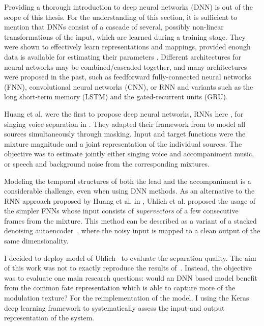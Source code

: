 Providing a thorough introduction to deep neural networks (DNN) is out of the scope of this thesis.
For the understanding of this section, it is sufficient to mention that DNNs consist of a cascade of several, possibly non-linear transformations of the input, which are learned during a training stage.
They were shown to effectively learn representations and mappings, provided enough data is available for estimating their parameters \cite{deng14, lecun15, goodfellow16}.
Different architectures for neural networks may be combined/cascaded together, and many architectures were proposed in the past, such as feedforward fully-connected neural networks (FNN), convolutional neural networks (CNN), or RNN and variants such as the long short-term memory (LSTM) and the gated-recurrent units (GRU).
\par
Huang et al. were the first to propose deep neural networks, RNNs here \cite{hermans13,pascanu14}, for singing voice separation in \cite{huang14,huang15}. They adapted their framework from \cite{huang142} to model all sources simultaneously through masking. Input and target functions were the mixture magnitude and a joint representation of the individual sources. The objective was to estimate jointly either singing voice and accompaniment music, or speech and background noise from the corresponding mixtures.
\par
Modeling the temporal structures of both the lead and the accompaniment is a considerable challenge, even when using DNN methods. As an alternative to the RNN approach proposed by Huang et al. in \cite{huang14}, Uhlich et al. proposed the usage of the simpler FNNs \cite{uhlich15} whose input consists of \textit{supervectors} of a few consecutive frames from the mixture.
This method can be described as a variant of a stacked denoising autoencoder~\cite{pvincent08}, where the noisy input is mapped to a clean output of the same dimensionality.
\par
I decided to deploy model of Uhlich~\cite{uhlich15} to evaluate the separation quality.
The aim of this work was not to exactly reproduce the results of~\cite{uhlich15}.
Instead, the objective was to evaluate one main research questions: would an DNN based model benefit from the common fate representation which is able to capture more of the modulation texture?
For the reimplementation of the model, I using the Keras~\cite{chollet15} deep learning framework to systematically assess the input-and output representation of the system.

